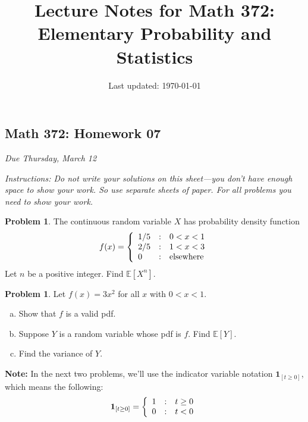 \documentclass[10pt]{article}
\title{Lecture Notes for Math 372: \\Elementary Probability and Statistics}
\date{Last updated: \today}
\theoremstyle{definition}
\newtheorem{problem}[theorem]{Problem}
\newcommand{\vt}{\vskip 5mm} %
\newcommand{\Fl}{\vt\noindent\textbf} %
\newcommand{\1}[1]{\textbf{1}_{\left[#1\right]}} %
\def\E{\mathbb{E}} %
\begin{document}
\begin{center}
  \section*{Math 372: Homework 07}
  \textit{Due Thursday, March 12}
\end{center}

\textit{Instructions: Do not write your solutions on this sheet---you don't have enough space to show
your work. So use separate sheets of paper. For all problems you need to show your work.}

\begin{problem}
  The continuous random variable $X$ has probability density function
  \begin{equation*}
    f(x) = \left\{ \begin{array}{l@{\quad:\quad}l}
        1/5& 0<x<1\\
        2/5& 1<x<3\\
        0& \text{elsewhere}
      \end{array}\right.
  \end{equation*}
  Let $n$ be a positive integer. Find $\E\left[X^{n} \right]$.
\end{problem}



\begin{problem}
  Let $f(x) = 3x^{2}$ for all $x$ with $0<x<1$.
  \begin{enumerate}[(a)] 
    \item Show that $f$ is a valid pdf. 
    \item Suppose $Y$ is a random variable whose pdf is $f$. Find
    $\E\left[Y \right]$.
    \item Find the variance of $Y$.
  \end{enumerate}
\end{problem}




\Fl{Note:} In the next two problems, we'll use the indicator variable notation
$\mathbf{1}_{\left[ t \geq 0\right]}$, which means the following:
\begin{equation*}
  \mathbf{1}_{\left[ t \geq 0\right]}= \left\{ \begin{array}{l@{\quad:\quad}l}
      1 & t\geq0 \\ 0 & t<0\end{array}\right.
\end{equation*}
\end{document}
